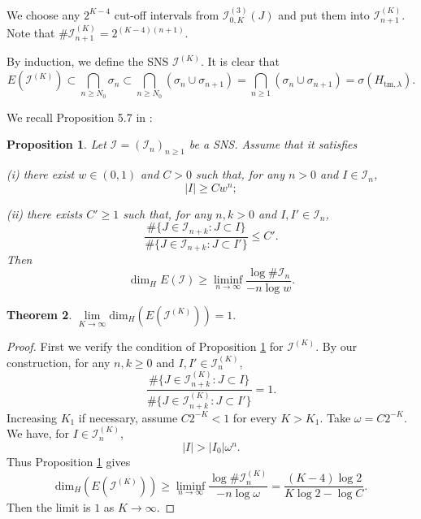 \documentclass{amsart}
\newtheorem{thm}{Theorem}
\newtheorem{prop}[thm]{Proposition}
\theoremstyle{definition}
\begin{document}
We choose any  $2^{K-4}$ cut-off intervals from $\mathcal{I}_{0,K}^{(3)}(J)$ and put them
into $\mathcal{I}_{n+1}^{(K)}$.
Note that $\#\mathcal{I}_{n+1}^{(K)}=2^{(K-4)(n+1)}$.

By induction, we define the SNS $\mathcal{I}^{(K)}$.
It is clear that 
$$E(\mathcal{I}^{(K)})\subset 
\bigcap_{n\ge N_0}\sigma_n\subset
\bigcap_{n\ge N_0}(\sigma_{n}\cup\sigma_{n+1})=
\bigcap_{n\ge1}(\sigma_{n}\cup\sigma_{n+1})
=\sigma(H_{\mathrm{tm},\lambda}).$$

We recall  Proposition 5.7 in \cite{LQY22}:
\begin{prop}
\label{1944}
Let $\mathcal{I}=(\mathcal{I}_n)_{n\geq 1}$ be a SNS. 
Assume that it satisfies 

 (i) there exist $w\in(0,1)$ and $C>0$ such that, for any $n>0$ and $I\in\mathcal{I}_n$,
    $$
    |I|\geq Cw^n;
    $$
    
 (ii) there exists $C'\geq 1$ such that, for any $n,k> 0$ and $I,I'\in\mathcal{I}_n$,
    $$
    \frac{
    \#\{J\in\mathcal{I}_{n+k}:J\subset I\}
    }{
    \#\{J\in\mathcal{I}_{n+k}:J\subset I'\}
    }
    \leq C'.
    $$
Then
$$
\dim_H E(\mathcal{I})
\geq
\liminf_{n\to\infty}
\frac{\log \#\mathcal{I}_n}{-n\log w}.
$$
\end{prop}

\begin{thm}
$\lim\limits_{K\to\infty}\mathrm{dim}_{H}(E(\mathcal{I}^{(K)}))=1.$
\end{thm}    

\begin{proof}
  First we verify the condition of Proposition \ref{1944} for 
$\mathcal{I}^{(K)}$.
By our construction, for any $n,k\geq 0$ and $I,I'\in\mathcal{I}_n^{(K)}$,
 $$
    \frac{
    \#\{J\in\mathcal{I}_{n+k}^{(K)}:J\subset I\}
    }{
    \#\{J\in\mathcal{I}_{n+k}^{(K)}:J\subset I'\}
    }
    =1.
    $$
Increasing $K_1$ if necessary, assume $C2^{-K}<1$ for every $K>K_1$. Take $\omega=C2^{-K}$. We have, for $I\in\mathcal{I}_n^{(K)}$,
\begin{equation*}
|I|>|I_0|\omega^{n}.
\end{equation*}
Thus Proposition \ref{1944} gives
\begin{equation*}
    \mathrm{dim}_H(E(\mathcal{I}^{(K)}))\ge
    \liminf_{n\to\infty}\frac{\log\# \mathcal{I}_{n}^{(K)}}
    {-n\log \omega}
    =\frac{(K-4)\log2}{K\log2-\log{C}}.
    \end{equation*}
Then the limit is $1$ as $K\to\infty$.
\end{proof}
\end{document}

